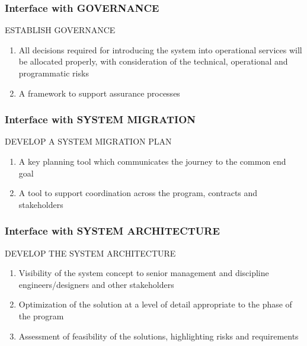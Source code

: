 \begin{frame}
\frametitle{Interface with  GOVERNANCE }
\begin{block}{ESTABLISH GOVERNANCE}

\begin{enumerate}
    \item All decisions required for introducing the system into operational services will be allocated properly, with consideration of the technical, operational and programmatic risks
   \item  A framework to support assurance processes
\end{enumerate}

\end{block}
\end{frame}





\begin{frame}
\frametitle{Interface with SYSTEM MIGRATION }
\begin{block}{DEVELOP A SYSTEM MIGRATION PLAN}

\begin{enumerate}
    \item  A key planning tool which communicates the journey to the common end goal
   \item  A tool to support coordination across the program, contracts and stakeholders 
\end{enumerate}

\end{block}
\end{frame}



\begin{frame}
\frametitle{Interface with  SYSTEM ARCHITECTURE }
\begin{block}{DEVELOP THE SYSTEM ARCHITECTURE}

\begin{enumerate}
    \item  Visibility of the system concept to senior management and discipline engineers/designers and other stakeholders
   \item  Optimization of the solution at a level of detail appropriate to the phase of the program
    \item Assessment of feasibility of the solutions, highlighting risks and requirements
\end{enumerate}

\end{block}
\end{frame}





